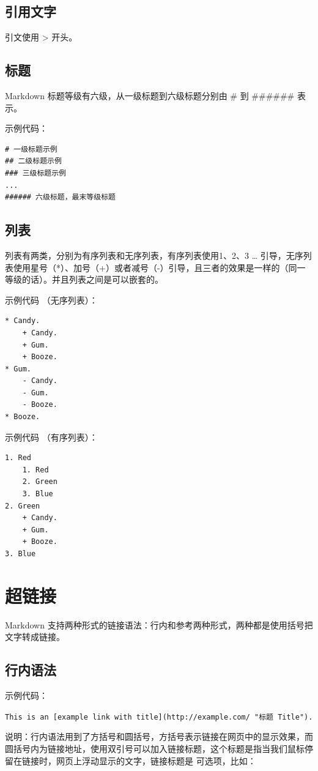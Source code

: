 \subsection{引用文字}
引文使用 > 开头。


\subsection{标题}
Markdown 标题等级有六级，从一级标题到六级标题分别由 \# 到 \#\#\#\#\#\# 表示。

示例代码：
\begin{verbatim}
# 一级标题示例
## 二级标题示例
### 三级标题示例
...
###### 六级标题，最末等级标题
\end{verbatim}


\subsection{列表}
列表有两类，分别为有序列表和无序列表，有序列表使用1、2、3 … 引导，无序列表使用星号（*）、加号（+）或者减号（-）引导，且三者的效果是一样的（同一等级的话）。并且列表之间是可以嵌套的。

示例代码 （无序列表）：
\begin{verbatim}
* Candy.
    + Candy.
    + Gum.
    + Booze.
* Gum.
    - Candy.
    - Gum.
    - Booze.
* Booze.
\end{verbatim}

示例代码 （有序列表）：
\begin{verbatim}
1. Red
    1. Red
    2. Green
    3. Blue
2. Green
    + Candy.
    + Gum.
    + Booze.
3. Blue
\end{verbatim}



\section{超链接}
Markdown 支持两种形式的链接语法：行内和参考两种形式，两种都是使用括号把文字转成链接。

\subsection{行内语法}
示例代码：

\verb|This is an [example link with title](http://example.com/ "标题 Title").|

说明：行内语法用到了方括号和圆括号，方括号表示链接在网页中的显示效果，而圆括号内为链接地址，使用双引号可以加入链接标题，这个标题是指当我们鼠标停留在链接时，网页上浮动显示的文字，链接标题是 可选项，比如：


